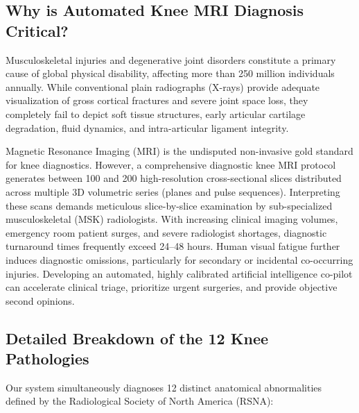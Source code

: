 \documentclass[11pt,a4paper]{article}
\begin{document}
\subsection{Why is Automated Knee MRI Diagnosis Critical?}
Musculoskeletal injuries and degenerative joint disorders constitute a primary cause of global physical disability, affecting more than 250 million individuals annually. While conventional plain radiographs (X-rays) provide adequate visualization of gross cortical fractures and severe joint space loss, they completely fail to depict soft tissue structures, early articular cartilage degradation, fluid dynamics, and intra-articular ligament integrity. 

Magnetic Resonance Imaging (MRI) is the undisputed non-invasive gold standard for knee diagnostics. However, a comprehensive diagnostic knee MRI protocol generates between 100 and 200 high-resolution cross-sectional slices distributed across multiple 3D volumetric series (planes and pulse sequences). Interpreting these scans demands meticulous slice-by-slice examination by sub-specialized musculoskeletal (MSK) radiologists. With increasing clinical imaging volumes, emergency room patient surges, and severe radiologist shortages, diagnostic turnaround times frequently exceed 24–48 hours. Human visual fatigue further induces diagnostic omissions, particularly for secondary or incidental co-occurring injuries. Developing an automated, highly calibrated artificial intelligence co-pilot can accelerate clinical triage, prioritize urgent surgeries, and provide objective second opinions.

\subsection{Detailed Breakdown of the 12 Knee Pathologies}
Our system simultaneously diagnoses 12 distinct anatomical abnormalities defined by the Radiological Society of North America (RSNA):
\end{document}
